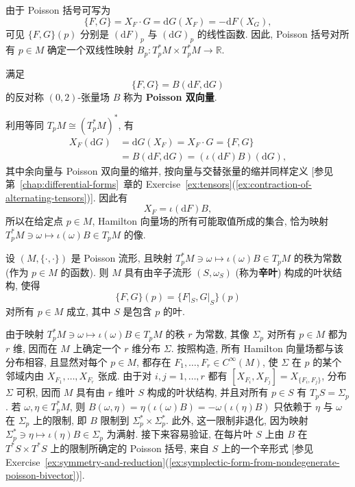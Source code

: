 由于 Poisson 括号可写为
\[
  \{F,G\}=X_F\cdot G=\mathrm{d}G(X_F)=-\mathrm{d}F(X_G),
\]
可见 $\{F,G\}(p)$ 分别是 $(\mathrm{d}F)_p$ 与 $(\mathrm{d}G)_p$ 的线性函数. 因此, Poisson 括号对所有 $p\in M$ 确定一个双线性映射 $B_p:T_p^*M\times T_p^*M\to\mathbb{R}$.

\begin{RiemannDefinition}\label{def:poisson-bivector}
满足
\[
  \{F,G\}=B(\mathrm{d}F,\mathrm{d}G)
\]
的反对称 $(0,2)$-张量场 $B$ 称为 \textbf{Poisson 双向量}.
\end{RiemannDefinition}

利用等同 $T_pM\cong(T_p^*M)^*$, 有
\begin{align*}
  X_F(\mathrm{d}G)&=\mathrm{d}G(X_F)=X_F\cdot G=\{F,G\}\\
                  &=B(\mathrm{d}F,\mathrm{d}G)=(\iota(\mathrm{d}F)B)(\mathrm{d}G),
\end{align*}
其中余向量与 Poisson 双向量的缩并, 按向量与交替张量的缩并同样定义 [参见第~\ref{chap:differential-forms}~章的 Exercise~\ref{ex:tensors}(\ref{ex:contraction-of-alternating-tensors})]. 因此有
\[
  X_F=\iota(\mathrm{d}F)B,
\]
所以在给定点 $p\in M$, Hamilton 向量场的所有可能取值所成的集合, 恰为映射 $T_p^*M\ni\omega\mapsto\iota(\omega)B\in T_pM$ 的像.

\begin{RiemannTheorem}[Kirillov]\label{thm:kirillov-symplectic-leaves-of-poisson-manifold}
设 $(M,\{\cdot,\cdot\})$ 是 Poisson 流形, 且映射 $T_p^*M\ni\omega\mapsto\iota(\omega)B\in T_pM$ 的秩为常数 (作为 $p\in M$ 的函数). 则 $M$ 具有由辛子流形 $(S,\omega_S)$ (称为\textbf{辛叶}) 构成的叶状结构, 使得
\[
  \{F,G\}(p)=\{F|_S,G|_S\}(p)
\]
对所有 $p\in M$ 成立, 其中 $S$ 是包含 $p$ 的叶.
\end{RiemannTheorem}

\begin{RiemannProof}
由于映射 $T_p^*M\ni\omega\mapsto\iota(\omega)B\in T_pM$ 的秩 $r$ 为常数, 其像 $\Sigma_p$ 对所有 $p\in M$ 都为 $r$ 维, 因而在 $M$ 上确定一个 $r$ 维分布 $\Sigma$. 按照构造, 所有 Hamilton 向量场都与该分布相容, 且显然对每个 $p\in M$, 都存在 $F_1,\ldots,F_r\in C^\infty(M)$, 使 $\Sigma$ 在 $p$ 的某个邻域内由 $X_{F_1},\ldots,X_{F_r}$ 张成. 由于对 $i,j=1,\ldots,r$ 都有 $[X_{F_i},X_{F_j}]=X_{\{F_i,F_j\}}$, 分布 $\Sigma$ 可积, 因而 $M$ 具有由 $r$ 维叶 $S$ 构成的叶状结构, 并且对所有 $p\in S$ 有 $T_pS=\Sigma_p$. 若 $\omega,\eta\in T_p^*M$, 则 $B(\omega,\eta)=\eta(\iota(\omega)B)=-\omega(\iota(\eta)B)$ 只依赖于 $\eta$ 与 $\omega$ 在 $\Sigma_p$ 上的限制, 即 $B$ 限制到 $\Sigma_p^*\times\Sigma_p^*$. 此外, 这一限制非退化, 因为映射 $\Sigma_p^*\ni\eta\mapsto\iota(\eta)B\in\Sigma_p$ 为满射. 接下来容易验证, 在每片叶 $S$ 上由 $B$ 在 $T^*S\times T^*S$ 上的限制所确定的 Poisson 括号, 来自 $S$ 上的一个辛形式 [参见 Exercise~\ref{ex:symmetry-and-reduction}(\ref{ex:symplectic-form-from-nondegenerate-poisson-bivector})].
\end{RiemannProof}

